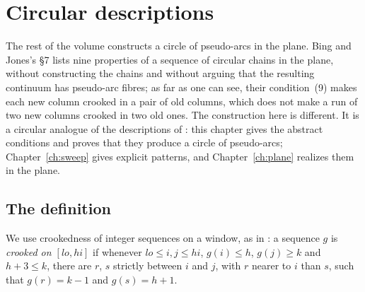 \chapter{Circular descriptions}\label{ch:circdescr}

The rest of the volume constructs a circle of pseudo-arcs in the plane. Bing and Jones's \S7 lists nine properties of a sequence of circular chains in the
plane, without constructing the chains and without arguing that the resulting continuum has pseudo-arc fibres; as far as one can see, their condition~(9)
makes each new column crooked in a pair of old columns, which does not make a run of two new columns crooked in two old ones. The construction here is
different. It is a circular analogue of the descriptions of : this chapter gives the abstract conditions and proves that they produce a circle
of pseudo-arcs; Chapter~\ref{ch:sweep} gives explicit patterns, and Chapter~\ref{ch:plane} realizes them in the plane.

\section{The definition}

We use crookedness of integer sequences on a window, as in : a sequence $g$ is \emph{crooked on $[lo,hi]$} if whenever $lo\le i,j\le hi$,
$g(i)\le h$, $g(j)\ge k$ and $h+3\le k$, there are $r$, $s$ strictly between $i$ and $j$, with $r$ nearer to $i$ than $s$, such that $g(r)=k-1$ and $g(s)=h+1$.


